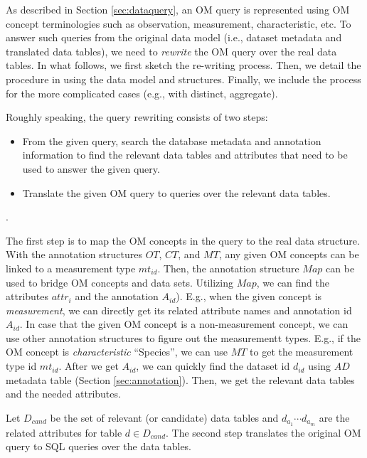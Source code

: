 As described in Section \ref{sec:dataquery}, 
an OM query is represented using 
OM concept terminologies such as observation, 
measurement, characteristic, etc. 
To answer such queries from the original data model (i.e., dataset 
metadata and translated data tables), 
we need to {\em rewrite} the OM query over the real data tables. 
In what follows, we first sketch the re-writing process. 
Then, we detail the procedure in using the data model and structures. 
Finally, we include the process for the more complicated
cases (e.g., with distinct, aggregate). 

Roughly speaking, the query rewriting consists of two steps:
\begin{itemize}
\item From the given query, search the database metadata and
  annotation information to find the relevant data tables and
  attributes that need to be used to answer the given query. 
\item Translate the given OM query to queries over the relevant data
  tables. 
\end{itemize}

. 

The first step is to map the OM concepts in the query to the real data
structure. 
With the annotation structures $OT$, $CT$, and $MT$, any given OM
concepts can be linked to a measurement type $mt_{id}$. 
Then, the annotation structure $Map$ can be used to bridge OM concepts and data sets. 
Utilizing $Map$, we can find the attributes $attr_i$ and the
annotation $A_{id}$).
E.g., when the given concept is {\em measurement}, we can directly get
its related attribute names and annotation id $A_{id}$. 
In case that the given OM concept is a non-measurement concept, we can use
other annotation structures to figure out the measurementt types. 
E.g., if the OM concept is {\em characteristic} ``Species'', we can use
$MT$ to get the measurement type id $mt_{id}$. 
After we get $A_{id}$, we can quickly find the dataset id $d_{id}$
using $AD$ metadata table (Section \ref{sec:annotation}). 
Then, we get the relevant data tables and the needed attributes. 

Let $D_{cand}$ be the set of relevant (or candidate) data tables and $d_{a_1} \cdots d_{a_m}$
are the related attributes for table $d\in D_{cand}$. 
The second step translates the original OM query to SQL queries over the data tables.  

